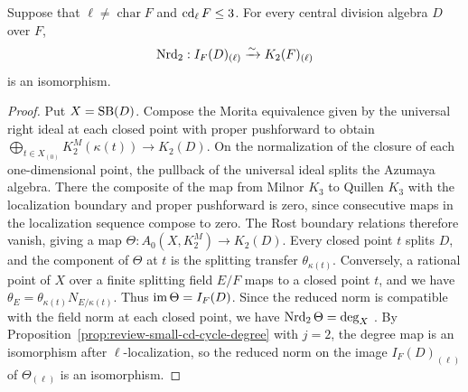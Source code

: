 \begin{corollary}
\label{cor:review-small-cd-splitting-transfer}
Suppose that $\ell\ne\operatorname{char}F$ and $\operatorname{cd}_\ell F\le3$.
For every central division algebra $D$ over $F$,
\[
 \operatorname{Nrd}_2:I_F(D)_{(\ell)}\xrightarrow{\sim}K_2(F)_{(\ell)}
\]
is an isomorphism.
\end{corollary}
\begin{proof}
Put $X=\operatorname{SB}(D)$.
Compose the Morita equivalence given by the universal right ideal at each closed point with proper pushforward to obtain $\bigoplus_{t\in X_{(0)}}K_2^M(\kappa(t))\to K_2(D)$.
On the normalization of the closure of each one-dimensional point, the pullback of the universal ideal splits the Azumaya algebra.
There the composite of the map from Milnor $K_3$ to Quillen $K_3$ with the localization boundary and proper pushforward is zero, since consecutive maps in the localization sequence compose to zero.
The Rost boundary relations therefore vanish, giving a map $\Theta:A_0(X,K_2^M)\to K_2(D)$.
Every closed point $t$ splits $D$, and the component of $\Theta$ at $t$ is the splitting transfer $\theta_{\kappa(t)}$.
Conversely, a rational point of $X$ over a finite splitting field $E/F$ maps to a closed point $t$, and we have $\theta_E=\theta_{\kappa(t)}N_{E/\kappa(t)}$.
Thus $\operatorname{im}\Theta=I_F(D)$.
Since the reduced norm is compatible with the field norm at each closed point, we have $\operatorname{Nrd}_2\Theta=\deg_X$ \cite{Rost,QuillenHigher,KahnLevine2010}.
By Proposition~\ref{prop:review-small-cd-cycle-degree} with $j=2$, the degree map is an isomorphism after $\ell$-localization, so the reduced norm on the image $I_F(D)_{(\ell)}$ of $\Theta_{(\ell)}$ is an isomorphism.
\end{proof}

